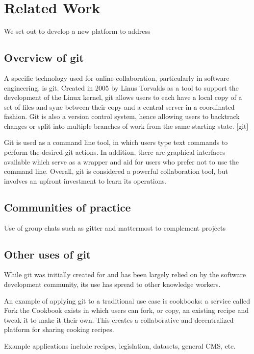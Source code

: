\documentclass[12pt,twoside,vi]{mitthesis}
\begin{document}
\chapter{Related Work}

We set out to develop a new platform to address 

\section{Overview of git}

A specific technology used for online collaboration, particularly in software engineering, is git. Created in 2005 by Linus Torvalds as a tool to support the development of the Linux kernel, git allows users to each have a local copy of a set of files and sync between their copy and a central server in a coordinated fashion. Git is also a version control system, hence allowing users to backtrack changes or split into multiple branches of work from the same starting state. [git]

Git is used as a command line tool, in which users type text commands to perform the desired git actions. In addition, there are graphical interfaces available which serve as a wrapper and aid for users who prefer not to use the command line. Overall, git is considered a powerful collaboration tool, but involves an upfront investment to learn its operations.

\section{Communities of practice}

Use of group chats such as gitter and mattermost to complement projects

\section{Other uses of git}

While git was initially created for and has been largely relied on by the software development community, its use has spread to other knowledge workers.

An example of applying git to a traditional use case is cookbooks: a service called Fork the Cookbook exists in which users can fork, or copy, an existing recipe and tweak it to make it their own. This creates a collaborative and decentralized platform for sharing cooking recipes.~\cite{forkthecookbook}

Example applications include recipes, legislation, datasets, general CMS, etc.
\end{document}
